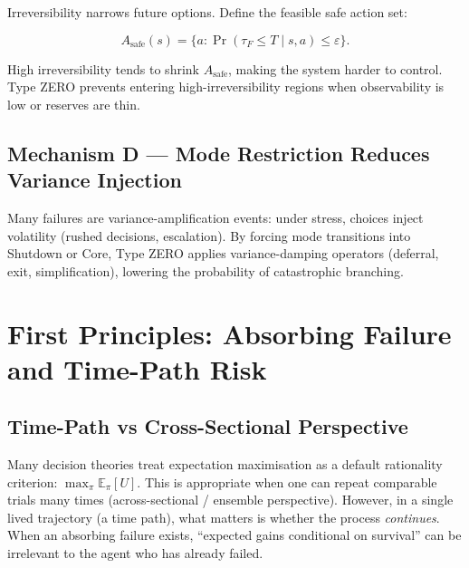 Irreversibility narrows future options. Define the feasible safe
action set:

\begin{equation}
A_{\mathrm{safe}}(s) = \{a : \Pr(\tau_F \le T \mid s, a) \le \varepsilon\}.
\label{eq:foundations-safe-action-set}
\end{equation}

High irreversibility tends to shrink $A_{\mathrm{safe}}$, making the
system harder to control. Type ZERO prevents entering
high-irreversibility regions when observability is low or reserves
are thin.

\subsection*{Mechanism D --- Mode Restriction Reduces Variance Injection}

Many failures are variance-amplification events: under stress,
choices inject volatility (rushed decisions, escalation). By forcing
mode transitions into Shutdown or Core, Type ZERO applies
variance-damping operators (deferral, exit, simplification),
lowering the probability of catastrophic branching.


\section{First Principles: Absorbing Failure and Time-Path Risk}
\label{sec:foundations-2-first-principles}

\subsection{Time-Path vs Cross-Sectional Perspective}
\label{sec:foundations-2-1-time-path}

Many decision theories treat expectation maximisation as a default
rationality criterion: $\max_\pi \mathbb{E}_\pi[U]$. This is
appropriate when one can repeat comparable trials many times
(across-sectional / ensemble perspective). However, in a single
lived trajectory (a time path), what matters is whether the process
\emph{continues}. When an absorbing failure exists, ``expected gains
conditional on survival'' can be irrelevant to the agent who has
already failed.

